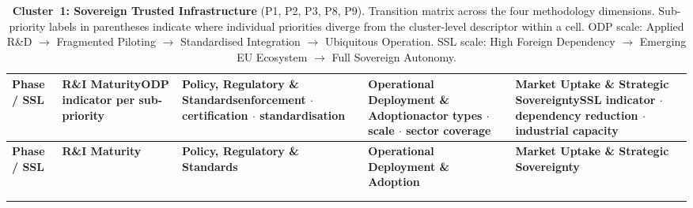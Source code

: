 \begin{landscape}
\setlength{\textwidth}{26.5cm}\setlength{\linewidth}{26.5cm}%
\setlength{\hsize}{26.5cm}\setlength{\columnwidth}{26.5cm}
\setlength{\tabcolsep}{5pt}
\renewcommand{\arraystretch}{1.35}

\begin{longtable}{%
|>{\footnotesize\raggedright\arraybackslash}p{2.8cm}%
|>{\footnotesize\raggedright\arraybackslash}p{5.4cm}%
|>{\footnotesize\raggedright\arraybackslash}p{5.4cm}%
|>{\footnotesize\raggedright\arraybackslash}p{5.4cm}%
|>{\footnotesize\raggedright\arraybackslash}p{5.4cm}|}

\caption{\textbf{Cluster~1: Sovereign Trusted Infrastructure} (P1, P2, P3, P8, P9).
Transition matrix across the four methodology dimensions. Sub-priority labels in
parentheses indicate where individual priorities diverge from the cluster-level
descriptor within a cell. ODP scale: Applied R\&D $\to$ Fragmented Piloting
$\to$ Standardised Integration $\to$ Ubiquitous Operation. SSL scale:
High Foreign Dependency $\to$ Emerging EU Ecosystem $\to$ Full Sovereign Autonomy.}
\label{tab:cluster1}\\

\hline
\rowcolor{colheader}
\textbf{Phase / SSL} &
\textbf{R\&I Maturity}{\scriptsize ODP indicator per sub-priority} &
\textbf{Policy, Regulatory \& Standards}{\scriptsize enforcement $\cdot$
  certification $\cdot$ standardisation} &
\textbf{Operational Deployment \& Adoption}{\scriptsize actor types $\cdot$
  scale $\cdot$ sector coverage} &
\textbf{Market Uptake \& Strategic Sovereignty}{\scriptsize SSL indicator
  $\cdot$ dependency reduction $\cdot$ industrial capacity} \\
\hline
\endfirsthead

\hline
\rowcolor{colheader}
\textbf{Phase / SSL} &
\textbf{R\&I Maturity} &
\textbf{Policy, Regulatory \& Standards} &
\textbf{Operational Deployment \& Adoption} &
\textbf{Market Uptake \& Strategic Sovereignty} \\
\hline
\endhead
\hline\multicolumn{5}{r}{\footnotesize\textit{Continued\ldots}}\\ \endfoot
\hline \endlastfoot


\end{longtable}
\end{landscape}

